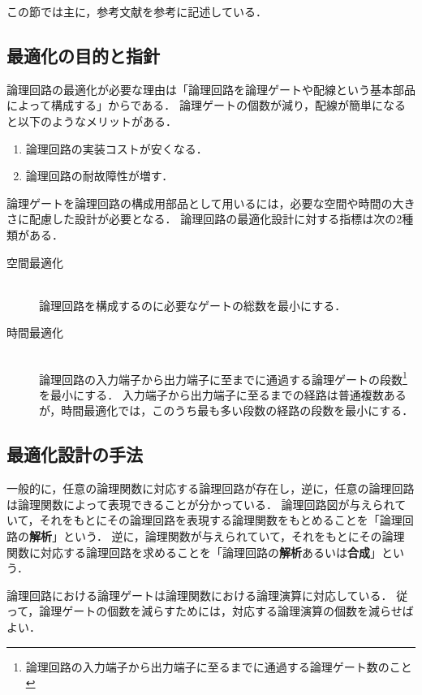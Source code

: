 \documentclass[uplatex]{jsarticle}
\begin{document}
この節では主に，参考文献\cite{siba}を参考に記述している．

\subsection{最適化の目的と指針}

論理回路の最適化が必要な理由は「論理回路を論理ゲートや配線という基本部品によって構成する」からである．
論理ゲートの個数が減り，配線が簡単になると以下のようなメリットがある．

\begin{enumerate}
  \item 論理回路の実装コストが安くなる．
  \item 論理回路の耐故障性が増す．
\end{enumerate}

論理ゲートを論理回路の構成用部品として用いるには，必要な空間や時間の大きさに配慮した設計が必要となる．
論理回路の最適化設計に対する指標は次の2種類がある．

\begin{description}
 \item[空間最適化]\mbox{}\\
   論理回路を構成するのに必要なゲートの総数を最小にする．
 \item[時間最適化]\mbox{}\\
  論理回路の入力端子から出力端子に至までに通過する論理ゲートの段数\footnote{論理回路の入力端子から出力端子に至るまでに通過する論理ゲート数のこと}を最小にする．
  入力端子から出力端子に至るまでの経路は普通複数あるが，時間最適化では，このうち最も多い段数の経路の段数を最小にする．
\end{description}

\subsection{最適化設計の手法}

一般的に，任意の論理関数に対応する論理回路が存在し，逆に，任意の論理回路は論理関数によって表現できることが分かっている．
論理回路図が与えられていて，それをもとにその論理回路を表現する論理関数をもとめることを「論理回路の{\bf 解析}」という．
逆に，論理関数が与えられていて，それをもとにその論理関数に対応する論理回路を求めることを「論理回路の{\bf 解析}あるいは{\bf 合成}」という．

論理回路における論理ゲートは論理関数における論理演算に対応している．
従って，論理ゲートの個数を減らすためには，対応する論理演算の個数を減らせばよい．
\end{document}
